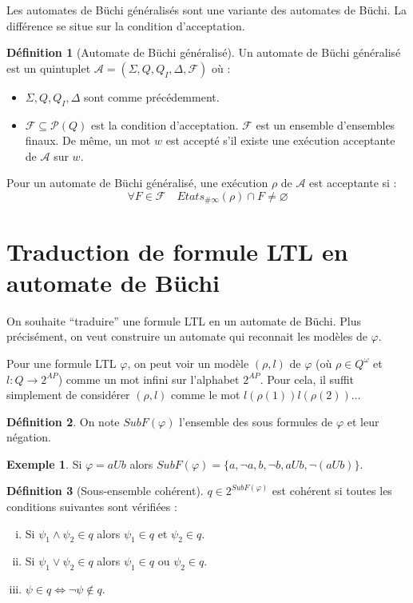 \documentclass[12pt,a4paper]{article}
\theoremstyle{plain}
\theoremstyle{definition}
\newtheorem{defi}{Définition}
\newtheorem{ex}{Exemple}
\begin{document}
Les automates de Büchi généralisés sont une variante des automates de Büchi.
La différence se situe sur la condition d'acceptation.
\begin{defi}[Automate de Büchi généralisé]
  Un automate de Büchi généralisé est un quintuplet $\mathcal{A}=(\Sigma, Q, Q_I, \Delta, \mathscr{F})$ où :
  \begin{itemize}
  \item $\Sigma, Q, Q_I, \Delta$ sont comme précédemment.
  \item $\mathscr{F} \subseteq \mathcal{P}(Q)$ est la condition d'acceptation.
    $\mathscr{F}$ est un ensemble d'ensembles finaux. De même, un mot $w$ est accepté s'il existe une exécution acceptante de $\mathcal{A}$ sur $w$.
  \end{itemize}
  
\end{defi}
Pour un automate de Büchi généralisé, une exécution $\rho$ de $\mathcal{A}$ est acceptante si :
\[
  \forall F \in \mathscr{F} \quad Etats_{\#\infty}(\rho) \cap F \neq \varnothing
\]

\section{Traduction de formule LTL en automate de Büchi}
On souhaite ``traduire'' une formule LTL en un automate de Büchi.
Plus précisément, on veut construire un automate qui reconnait les modèles de $\varphi$.

Pour une formule LTL $\varphi$, on peut voir un modèle $(\rho, l)$ de $\varphi$ (où $\rho \in Q^\omega$ et $l : Q \to 2^{AP}$) comme un mot infini sur l'alphabet $2^{AP}$.
Pour cela, il suffit simplement de considérer $(\rho, l)$ comme le mot $l(\rho(1))l(\rho(2))\dots$


\begin{defi}
  On note $SubF(\varphi)$ l'ensemble des sous formules de $\varphi$ et leur négation.
\end{defi}

\begin{ex}
  Si $\varphi = a U b$ alors $SubF(\varphi) = \{ a, \lnot a, b, \lnot b, a U b, \lnot(a U b)\}$.
\end{ex}

\begin{defi}[Sous-ensemble cohérent]
  $q \in 2^{SubF(\varphi)}$ est cohérent si toutes les conditions suivantes sont vérifiées :
  \begin{enumerate}[(i)]
  \item Si $\psi_1 \land \psi_2 \in q$ alors $\psi_1 \in q$ et $\psi_2 \in q$.
  \item Si $\psi_1 \lor \psi_2 \in q$ alors $\psi_1 \in q$ ou $\psi_2 \in q$.
  \item $\psi \in q \iff \lnot \psi \not\in q$.
  \end{enumerate}
\end{defi}
\end{document}
